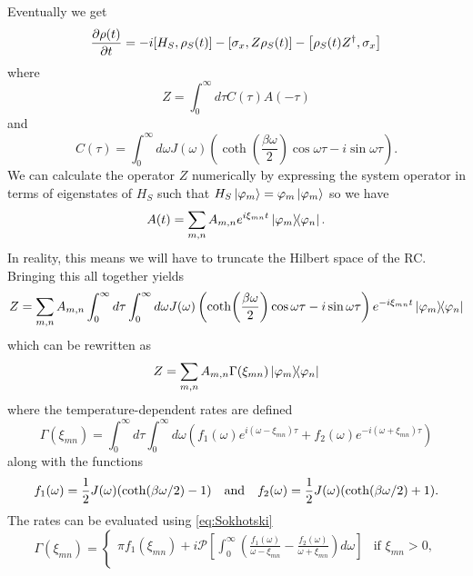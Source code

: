 \documentclass[]{article}
\begin{document}
\begin{itemize}
\begin{itemize}
Eventually we get
\begin{equation}
\label{nRWA_master}
\pdv{\rho(t)}{t} = -i[H_S, \rho_S(t)] - \left[\sigma_x, Z\rho_S(t)\right] - \left[\rho_S(t) Z^{\dagger}, \sigma_x\right]
\end{equation}
where
\begin{equation}
Z = \int_{0}^{\infty}d\tau C(\tau)A(-\tau)
\end{equation}
and
\begin{equation}
C(\tau) = \int_{0}^{\infty}d\omega J(\omega)\left(\coth(\frac{\beta \omega}{2}) \cos\omega\tau - i\sin\omega\tau\right).
\end{equation}
We can calculate the operator $Z$ numerically by expressing the system operator in terms of eigenstates of $H_S$ such that $H_S\ket{\varphi_m}=\varphi_m\ket{\varphi_m}$ so we have
\begin{equation}
\label{eq:Adecomposition}
A(t) = \sum_{m,n} A_{m,n} e^{i\xi_{mn}t}\dyad{\varphi_m}{\varphi_n}.
\end{equation}
In reality, this means we will have to truncate the Hilbert space of the RC. Bringing this all together yields
\begin{equation}
Z = \sum_{m,n} A_{m,n} \int_{0}^{\infty}d\tau \int_{0}^{\infty}d\omega J(\omega)\left(\coth(\frac{\beta \omega}{2}) \cos\omega\tau - i\sin\omega\tau\right)e^{-i\xi_{mn}t}\dyad{\varphi_m}{\varphi_n}
\end{equation}
which can be rewritten as
\begin{equation}
Z = \sum_{m,n} A_{m,n} \Gamma(\xi_{mn}) \dyad{\varphi_m}{\varphi_n}
\end{equation}
where the temperature-dependent rates are defined
\begin{equation}
\Gamma(\xi_{mn}) = \int_{0}^{\infty}d\tau \int_{0}^{\infty}d\omega \left(f_1(\omega)e^{i(\omega-\xi_{mn})\tau} + f_2(\omega)e^{-i(\omega+\xi_{mn})\tau}\right)
\end{equation}
along with the functions
\begin{equation}
f_1(\omega) = \frac{1}{2}J(\omega)(\coth(\beta \omega/2)-1) \quad \textnormal{and} \quad f_2(\omega)= \frac{1}{2}J(\omega)(\coth(\beta \omega/2)+1).
\end{equation}
The rates can be evaluated using \ref{eq:Sokhotski}
\begin{equation}
\Gamma(\xi_{mn}) =
\begin{cases}
\pi f_1(\xi_{mn}) + i\mathcal{P}\left[\int_{0}^{\infty}\left(\frac{f_1(\omega)}{\omega-\xi_{mn}} - \frac{f_2(\omega)}{\omega+\xi_{mn}}\right)d\omega\right] & \text{if } \xi_{mn}>0,\\ 

\end{cases}
\end{equation}
\end{itemize}
\end{itemize}
\end{document}
